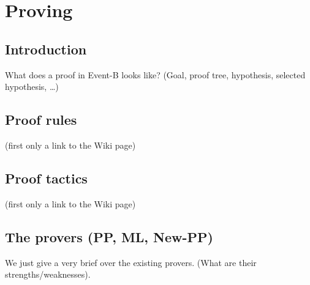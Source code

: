 \section{Proving}
\label{reference_04}

\subsection{Introduction}


What does a proof in Event-B looks like? (Goal, proof tree, hypothesis, selected hypothesis, \ldots)

\subsection{Proof rules}

(first only a link to the Wiki page)

\subsection{Proof tactics}

(first only a link to the Wiki page)

\subsection{The provers (PP, ML, New-PP)}

We just give a very brief over the existing provers. (What are their strengths/weaknesses).

